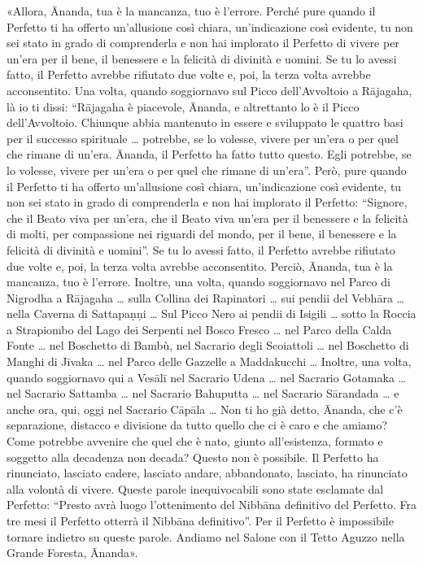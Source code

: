 «Allora, Ānanda, tua è la mancanza, tuo è l’errore. Perché pure quando il
Perfetto ti ha offerto un’allusione così chiara, un’indicazione così evidente,
tu non sei stato in grado di comprenderla e non hai implorato il Perfetto di
vivere per un’era per il bene, il benessere e la felicità di divinità e uomini.
Se tu lo avessi fatto, il Perfetto avrebbe rifiutato due volte e, poi, la terza
volta avrebbe acconsentito. Una volta, quando soggiornavo sul Picco
dell’Avvoltoio a Rājagaha, là io ti dissi: “Rājagaha è piacevole, Ānanda, e
altrettanto lo è il Picco dell’Avvoltoio. Chiunque abbia mantenuto in essere e
sviluppato le quattro basi per il successo spirituale … potrebbe, se lo volesse,
vivere per un’era o per quel che rimane di un’era. Ānanda, il Perfetto ha fatto
tutto questo. Egli potrebbe, se lo volesse, vivere per un’era o per quel che
rimane di un’era”. Però, pure quando il Perfetto ti ha offerto un’allusione così
chiara, un’indicazione così evidente, tu non sei stato in grado di comprenderla
e non hai implorato il Perfetto: “Signore, che il Beato viva per un’era, che il
Beato viva un’era per il benessere e la felicità di molti, per compassione nei
riguardi del mondo, per il bene, il benessere e la felicità di divinità e
uomini”. Se tu lo avessi fatto, il Perfetto avrebbe rifiutato due volte e, poi,
la terza volta avrebbe acconsentito. Perciò, Ānanda, tua è la mancanza, tuo è
l’errore. Inoltre, una volta, quando soggiornavo nel Parco di Nigrodha a
Rājagaha … sulla Collina dei Rapinatori … sui pendii del Vebhāra … nella Caverna
di Sattapaṇṇi … Sul Picco Nero ai pendii di Isigili … sotto la Roccia a
Strapiombo del Lago dei Serpenti nel Bosco Fresco … nel Parco della Calda Fonte
… nel Boschetto di Bambù, nel Sacrario degli Scoiattoli … nel Boschetto di
Manghi di Jīvaka … nel Parco delle Gazzelle a Maddakucchi … Inoltre, una volta,
quando soggiornavo qui a Vesālī nel Sacrario Udena … nel Sacrario Gotamaka … nel
Sacrario Sattamba … nel Sacrario Bahuputta … nel Sacrario Sārandada … e anche
ora, qui, oggi nel Sacrario Cāpāla … Non ti ho già detto, Ānanda, che c’è
separazione, distacco e divisione da tutto quello che ci è caro e che amiamo?
Come potrebbe avvenire che quel che è nato, giunto all’esistenza, formato e
soggetto alla decadenza non decada? Questo non è possibile. Il Perfetto ha
rinunciato, lasciato cadere, lasciato andare, abbandonato, lasciato, ha
rinunciato alla volontà di vivere. Queste parole inequivocabili sono state
esclamate dal Perfetto: “Presto avrà luogo l’ottenimento del Nibbāna definitivo
del Perfetto. Fra tre mesi il Perfetto otterrà il Nibbāna definitivo”. Per il
Perfetto è impossibile tornare indietro su queste parole. Andiamo nel Salone con
il Tetto Aguzzo nella Grande Foresta, Ānanda».

